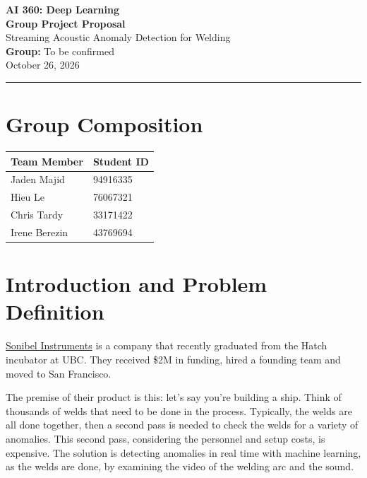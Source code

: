 \documentclass[11pt]{article}
\newcommand{\coursename}{AI 360: Deep Learning}
\newcommand{\groupname}{To be confirmed}
\newcommand{\projecttitle}{Streaming Acoustic Anomaly Detection for Welding}
\begin{document}
\begin{center}
    {\Large \textbf{\coursename}}\\[0.4em]
    {\LARGE \textbf{Group Project Proposal}}\\[1em]
    {\large \projecttitle}\\[1em]
    \textbf{Group:} \groupname\\
    October 26, 2026
\end{center}

\vspace{0.5em}
\hrule
\vspace{1em}

\section{Group Composition}

\begin{center}
\begin{tabularx}{\textwidth}{X l}
    \toprule
    \textbf{Team Member} & \textbf{Student ID} \\
    \midrule
    Jaden Majid & 94916335\\
    Hieu Le & 76067321\\
    Chris Tardy & 33171422\\
    Irene Berezin & 43769694\\
    \bottomrule
\end{tabularx}
\end{center}

\section{Introduction and Problem Definition}

\href{https://sonibelinstruments.com/}{Sonibel Instruments} is a company that recently graduated from the Hatch incubator at UBC. They received \$2M in funding, hired a founding team and moved to San Francisco.

The premise of their product is this: let's say you're building a ship. Think of thousands of welds that need to be done in the process. Typically, the welds are all done together, then a second pass is needed to check the welds for a variety of anomalies. This second pass, considering the personnel and setup costs, is expensive. The solution is detecting anomalies in real time with machine learning, as the welds are done, by examining the video of the welding arc and the sound.
\end{document}

